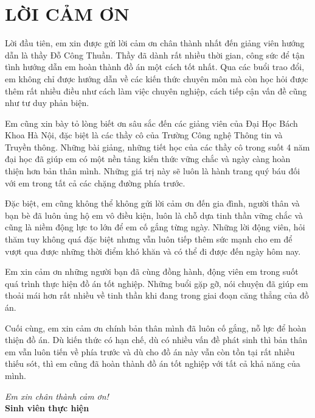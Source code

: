 \chapter*{LỜI CẢM ƠN}

Lời đầu tiên, em xin được gửi lời cảm ơn chân thành nhất đến giảng viên
hướng dẫn là thầy Đỗ Công Thuần. Thầy đã dành rất nhiều thời gian,
công sức để tận tình hướng dẫn em hoàn thành đồ án một cách tốt nhất. Qua
các buổi trao đổi, em không chỉ được hướng dẫn về các kiến thức chuyên môn
mà còn học hỏi được thêm rất nhiều điều như cách làm việc chuyên nghiệp,
cách tiếp cận vấn đề cũng như tư duy phản biện.

Em cũng xin bày tỏ lòng biết ơn sâu sắc đến các giảng viên của Đại Học
Bách Khoa Hà Nội, đặc biệt là các thầy cô của Trường Công nghệ Thông tin
và Truyền thông. Những bài giảng, những tiết học của các thầy cô trong suốt
4 năm đại học đã giúp em có một nền tảng kiến thức vững chắc và ngày càng
hoàn thiện hơn bản thân mình. Những giá trị này sẽ luôn là hành trang quý
báu đối với em trong tất cả các chặng đường phía trước.

Đặc biệt, em cũng không thể không gửi lời cảm ơn đến gia đình, người
thân và bạn bè đã luôn ủng hộ em vô điều kiện, luôn là chỗ dựa tinh thần
vững chắc và cũng là niềm động lực to lớn để em cố gắng từng ngày. Những
lời động viên, hỏi thăm tuy không quá đặc biệt nhưng vẫn luôn tiếp thêm
sức mạnh cho em để vượt qua được những thời điểm khó khăn và có thể đi
được đến ngày hôm nay.

Em xin cảm ơn những người bạn đã cùng đồng hành, động viên em trong
suốt quá trình thực hiện đồ án tốt nghiệp. Những buổi gặp gỡ, nói chuyện đã
giúp em thoải mái hơn rất nhiều về tinh thần khi đang trong giai đoạn căng
thẳng của đồ án.

Cuối cùng, em xin cảm ơn chính bản thân mình đã luôn cố gắng, nỗ lực
để hoàn thiện đồ án. Dù kiến thức có hạn chế, dù có nhiều vấn đề phát sinh
thì bản thân em vẫn luôn tiến về phía trước và dù cho đồ án này vẫn còn tồn
tại rất nhiều thiếu sót, thì em cũng đã hoàn thành đồ án tốt nghiệp với tất
cả khả năng của mình.

\vspace{1cm}
\begin{flushright}
\textit{Em xin chân thành cảm ơn!}\\[1.5cm]
\textbf{Sinh viên thực hiện}
\end{flushright}
